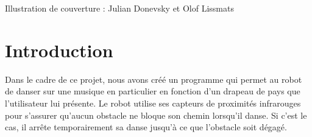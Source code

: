 \documentclass{article}
\begin{document}
\begin{titlepage}
        \begin{center}
        \end{center}
        
        \vspace{5cm}
        
        \vspace*{\fill}
    \end{titlepage}

    \thispagestyle{empty}

    \tableofcontents
    
    \vfill
    
    \noindent Illustration de couverture : Julian Donevsky et Olof Lissmats

    \newpage

    \setcounter{page}{1}

    \section{Introduction}

    Dans le cadre de ce projet, nous avons créé un programme qui permet au robot de danser sur une musique en particulier en fonction d'un drapeau de pays que l'utilisateur lui présente.
    Le robot utilise ses capteurs de proximités infrarouges pour s'assurer qu'aucun obstacle ne bloque son chemin lorsqu'il danse. 
    Si c'est le cas, il arrête temporairement sa danse jusqu'à ce que l'obstacle soit dégagé.
\end{document}
